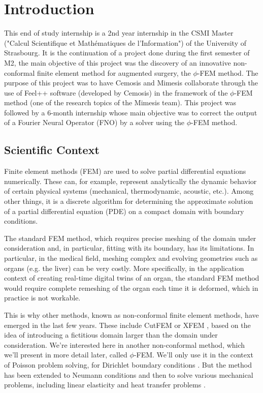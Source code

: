 \section{Introduction}

This end of study internship is a 2nd year internship in the CSMI Master ("Calcul Scientifique et Mathématiques de l'Information") of the University of Strasbourg. It is the continuation of a project done during the first semester of M2, the main objective of this project was the discovery of an innovative non-conformal finite element method for augmented surgery, the $\phi$-FEM method. The purpose of this project was to have Cemosis and Mimesis collaborate through the use of Feel++ software (developed by Cemosis) in the framework of the $\phi$-FEM method (one of the research topics of the Mimesis team). This project was followed by a 6-month internship whose main objective was to correct the output of a Fourier Neural Operator (FNO) by a solver using the $\phi$-FEM method.

\subsection{Scientific Context}

Finite element methods (FEM) are used to solve partial differential equations numerically. These can, for example, represent analytically the dynamic behavior of certain physical systems (mechanical, thermodynamic, acoustic, etc.). Among other things, it is a discrete algorithm for determining the approximate solution of a partial differential equation (PDE) on a compact domain with boundary conditions. 

The standard FEM method, which requires precise meshing of the domain under consideration and, in particular, fitting with its boundary, has its limitations. In particular, in the medical field, meshing complex and evolving geometries such as organs (e.g. the liver) can be very costly. More specifically, in the application context of creating real-time digital twins of an organ, the standard FEM method would require complete remeshing of the organ each time it is deformed, which in practice is not workable. 

This is why other methods, known as non-conformal finite element methods, have emerged in the last few years. These include CutFEM \cite{burman_cutfem_2015} or XFEM \cite{moes_x-fem_2002}, based on the idea of introducing a fictitious domain larger than the domain under consideration. We're interested here in another non-conformal method, which we'll present in more detail later, called $\phi$-FEM. We'll only use it in the context of Poisson problem solving, for Dirichlet boundary conditions \cite{duprez_phi-fem_2020}. But the method has been extended to Neumann conditions \cite{duprez_new_2023} and then to solve various mechanical problems, including linear elasticity \cite[Chapter~2]{cotin_phi-fem_nodate} and heat transfer problems \cite[Chapter~5]{cotin_phi-fem_nodate}.

